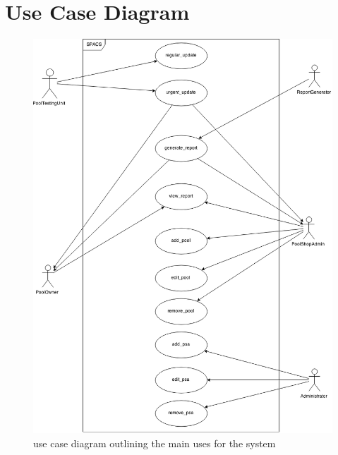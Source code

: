 \newcommand{\usecase}[7]{
\begin{center}
\begin{tabular}[h!]{| l | p{12cm} |}
	\hline
	\textbf{Name} & \small{#1} \\ \hline
	\textbf{Actors} & \small{#2} \\ \hline
	\textbf{Goal} & \small{#3} \\ \hline
	\textbf{Preconditions} & \small{#4} \\ \hline
	\textbf{Basic Flow} & \small{#5} \\ \hline
	\textbf{Alternative Flow} & \small{#6} \\ \hline
	\textbf{Postconditions} & \small{#7} \\ \hline
\end{tabular}
\end{center}
}

\section{Use Case Diagram}

\begin{figure}[h!]
\begin{center}
	\includegraphics[width=13cm]{images/UseCaseDiagram}
	\caption{use case diagram outlining the main uses for the system}
\end{center}
\end{figure}

